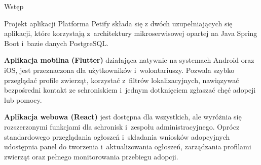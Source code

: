 \documentclass[final]{beamer} %
\begin{document}
\begin{frame}{}
\begin{columns}[T]
\begin{column}[T]{0.48\textwidth}
\begin{block}{Wstęp}
\end{block}
\begin{block}{Projekt aplikacji}
\justifying
Platforma Petify składa się z dwóch uzupełniających się aplikacji, które korzystają z~architektury mikroserwisowej opartej na Java Spring Boot i~bazie danych PostgreSQL.

\textbf{Aplikacja mobilna (Flutter)} działająca natywnie na systemach Android oraz iOS, jest przeznaczona dla użytkowników i~wolontariuszy. Pozwala szybko przeglądać profile zwierząt, korzystać z~filtrów lokalizacyjnych, nawiązywać bezpośredni kontakt ze schroniskiem i~jednym dotknięciem zgłaszać chęć adopcji lub pomocy.

\textbf{Aplikacja webowa (React)} jest dostępna dla wszystkich, ale wyróżnia się rozszerzonymi funkcjami dla schronisk i~zespołu administracyjnego. Oprócz standardowego przeglądania ogłoszeń i~składania wniosków adopcyjnych udostępnia panel do tworzenia i~aktualizowania ogłoszeń, zarządzania profilami zwierząt oraz pełnego monitorowania przebiegu adopcji.


\end{block}
\end{column}
\end{columns}
\end{frame}
\end{document}
